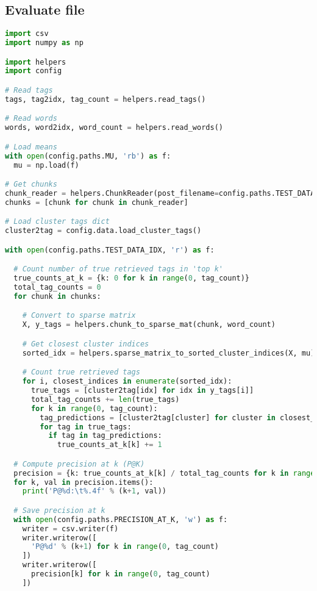 \subsection{Evaluate file}
\label{app:eval}

\begin{lstlisting}[language=python]
import csv
import numpy as np

import helpers
import config

# Read tags
tags, tag2idx, tag_count = helpers.read_tags()

# Read words
words, word2idx, word_count = helpers.read_words()

# Load means
with open(config.paths.MU, 'rb') as f:
  mu = np.load(f)

# Get chunks
chunk_reader = helpers.ChunkReader(post_filename=config.paths.TEST_DATA_IDX, chunk_size=config.data.CHUNK_SIZE)
chunks = [chunk for chunk in chunk_reader]

# Load cluster tags dict
cluster2tag = config.data.load_cluster_tags()

with open(config.paths.TEST_DATA_IDX, 'r') as f:

  # Count number of true retrieved tags in 'top k'
  true_counts_at_k = {k: 0 for k in range(0, tag_count)}
  total_tag_counts = 0
  for chunk in chunks:

    # Convert to sparse matrix
    X, y_tags = helpers.chunk_to_sparse_mat(chunk, word_count)

    # Get closest cluster indices
    sorted_idx = helpers.sparse_matrix_to_sorted_cluster_indices(X, mu)

    # Count true retrieved tags
    for i, closest_indices in enumerate(sorted_idx):
      true_tags = [cluster2tag[idx] for idx in y_tags[i]]
      total_tag_counts += len(true_tags)
      for k in range(0, tag_count):
        tag_predictions = [cluster2tag[cluster] for cluster in closest_indices[0:k+1]]
        for tag in true_tags:
          if tag in tag_predictions:
            true_counts_at_k[k] += 1

  # Compute precision at k (P@K)
  precision = {k: true_counts_at_k[k] / total_tag_counts for k in range(0, tag_count)}
  for k, val in precision.items():
    print('P@%d:\t%.4f' % (k+1, val))

  # Save precision at k
  with open(config.paths.PRECISION_AT_K, 'w') as f:
    writer = csv.writer(f)
    writer.writerow([
      'P@%d' % (k+1) for k in range(0, tag_count)
    ])
    writer.writerow([
      precision[k] for k in range(0, tag_count)
    ])
\end{lstlisting}


